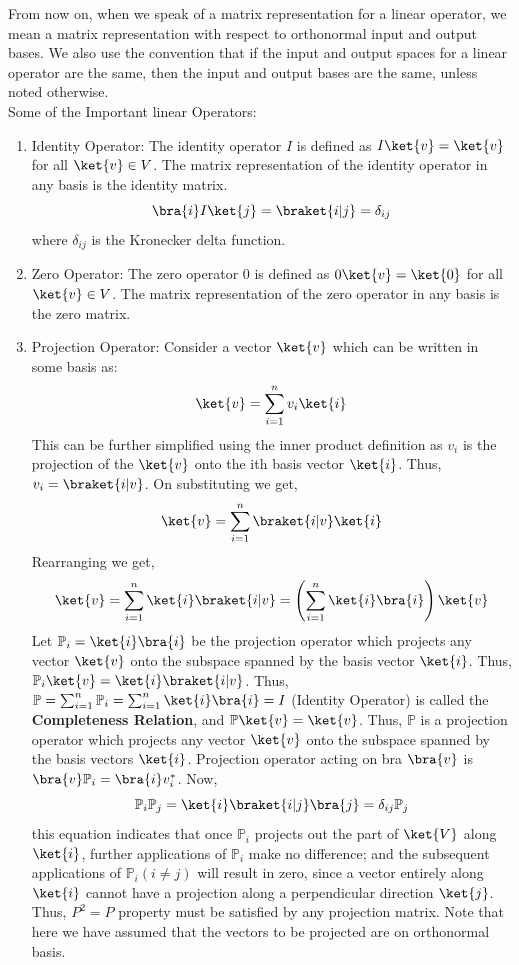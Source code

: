 \documentclass[12pt, oneside]{book}
\theoremstyle{definition}
\theoremstyle{definition}
\theoremstyle{remark}
\begin{document}
From now on, when we speak of a matrix representation for a linear operator, we mean a matrix representation with respect
to orthonormal input and output bases. We also use the convention that if the input and output spaces for a linear operator are the same,
then the input and output bases are the same, unless noted otherwise.
\\
Some of the Important linear Operators: 
\begin{enumerate}
    \item Identity Operator: The identity operator $I$ is defined as $I\ket{v}=\ket{v}$ for all $\ket{v}\in V$. The matrix representation of the identity operator in any basis is the identity matrix.
    \[\bra{i}I\ket{j}=\braket{i|j}=\delta_{ij}\] 
    where $\delta_{ij}$ is the Kronecker delta function.
    \item Zero Operator: The zero operator $0$ is defined as $0\ket{v}=\ket{0}$ for all $\ket{v}\in V$. The matrix representation of the zero operator in any basis is the zero matrix.
    \item Projection Operator: Consider a vector $\ket{v}$ which can be written in some basis as:
    \[ \ket{v}=\sum_{i=1}^{n}v_i\ket{i} \]
    This can be further simplified using the inner product definition as $v_i$ is the projection of the $\ket{v}$ onto the ith basis vector $\ket{i}$.
    Thus, $v_i=\braket{i|v}$. On substituting we get,
    \[ \ket{v}=\sum_{i=1}^{n}\braket{i|v}\ket{i} \]
    Rearranging we get,
    \[ \ket{v}=\sum_{i=1}^{n}\ket{i}\braket{i|v} =\left(\sum_{i=1}^n \ket{i}\bra{i} \right) \ket{v}\]
    Let $\mathbb{P}_i = \ket{i}\bra{i}$ be the projection operator which projects any vector $\ket{v}$ onto the subspace spanned by the basis vector $\ket{i}$.
    Thus, $\mathbb{P}_i\ket{v}=\ket{i}\braket{i|v}$. Thus, $\mathbb{P}=\sum_{i=1}^n \mathbb{P}_i = \sum_{i=1}^n \ket{i}\bra{i} = I$ (Identity Operator) is called the \textbf{Completeness Relation}, and $\mathbb{P}\ket{v}=\ket{v}$. Thus, $\mathbb{P}$ is a projection operator which projects any vector $\ket{v}$ 
    onto the subspace spanned by the basis vectors $\ket{i}$. Projection operator acting on bra $\bra{v}$ is 
    $\bra{v}\mathbb{P}_i=\bra{i}v_i^*$.
    Now, 
    \[\mathbb{P}_i\mathbb{P}_j=\ket{i}\braket{i|j}\bra{j}=\delta_{ij}\mathbb{P}_j\]
    this equation indicates that once $\mathbb{P}_i$ projects out the part of $\ket{V}$ along $\ket{i}$, further applications
    of $\mathbb{P}_i$ make no difference; and the subsequent applications of $\mathbb{P}_i (i \neq j)$ will result in zero, since 
    a vector entirely along $\ket{i}$ cannot have a projection along a perpendicular direction $\ket{j}$. Thus, $P^2=P$ property must be satisfied by any projection matrix. Note that here we have assumed that the vectors to be projected
    are on orthonormal basis.


\end{enumerate}
\end{document}
